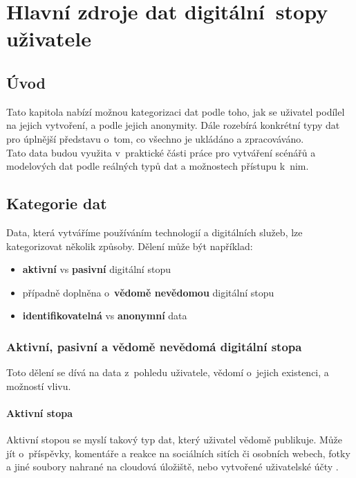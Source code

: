 \chapter{Hlavní zdroje dat digitální~stopy\\ uživatele}

\section*{Úvod}
Tato kapitola nabízí možnou kategorizaci dat podle toho, jak se uživatel podílel na jejich vytvoření, a podle jejich anonymity. Dále rozebírá konkrétní typy dat pro úplnější představu o~tom, co všechno je ukládáno a zpracováváno.\\
Tato data budou využita v~praktické části práce pro vytváření scénářů a modelových dat podle reálných typů dat a možnostech přístupu k~nim.

\section{Kategorie dat}
Data, která vytváříme používáním technologií a digitálních služeb, lze kategorizovat několik způsoby. Dělení může být například:
\begin{itemize}
	\item \textbf{aktivní} vs \textbf{pasivní} digitální stopu \citep{pew-digital-footprint}
    \item případně doplněna o~\textbf{vědomě nevědomou} digitální stopu \citep{fish-digital-footprint}
	\item \textbf{identifikovatelná} vs \textbf{anonymní} data 
\end{itemize}


\subsection{Aktivní, pasivní a vědomě nevědomá digitální stopa}
Toto dělení se dívá na data z~pohledu uživatele, vědomí o~jejich existenci, a možností vlivu. 

\subsubsection*{Aktivní stopa}
Aktivní stopou se myslí takový typ dat, který uživatel vědomě publikuje. Může jít o~příspěvky, komentáře a reakce na sociálních sitích či osobních webech, fotky a jiné soubory nahrané na cloudová úložiště, nebo vytvořené uživatelské účty \citep{pew-digital-footprint}.

